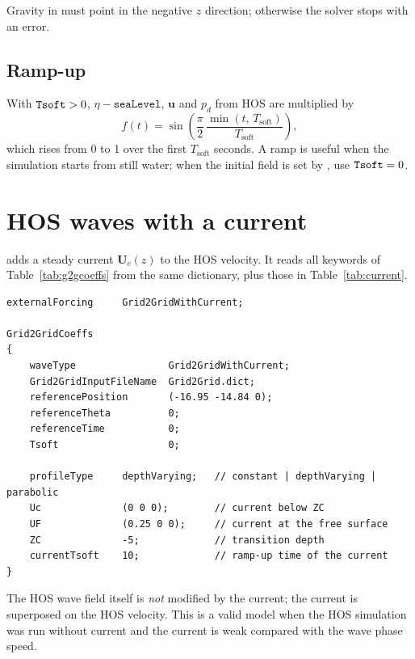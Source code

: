 Gravity in  must point in the negative $z$ direction; otherwise the solver
stops with an error.

\subsection{Ramp-up}
With $\texttt{Tsoft}>0$, $\eta - \texttt{seaLevel}$, $\mathbf u$ and $p_d$ from HOS are multiplied by
\begin{equation}
  f(t) = \sin\!\left(\frac{\pi}{2}\,\frac{\min(t,\,T_\mathrm{soft})}{T_\mathrm{soft}}\right),
\end{equation}
which rises from 0 to 1 over the first $T_\mathrm{soft}$ seconds. A ramp is useful when the
simulation starts from still water; when the initial field is set by , use
$\texttt{Tsoft}=0$.

\section{HOS waves with a current}
\label{sec:hos-current}
 adds a steady current $\mathbf U_c(z)$ to the HOS velocity. It reads
all keywords of Table~\ref{tab:g2gcoeffs} from the same  dictionary, plus
those in Table~\ref{tab:current}.
\begin{lstlisting}[caption={HOS waves with a depth-varying current (\file{tutorials/HOS\_with\_Current}).}]
externalForcing     Grid2GridWithCurrent;

Grid2GridCoeffs
{
    waveType                Grid2GridWithCurrent;
    Grid2GridInputFileName  Grid2Grid.dict;
    referencePosition       (-16.95 -14.84 0);
    referenceTheta          0;
    referenceTime           0;
    Tsoft                   0;

    profileType     depthVarying;   // constant | depthVarying | parabolic
    Uc              (0 0 0);        // current below ZC
    UF              (0.25 0 0);     // current at the free surface
    ZC              -5;             // transition depth
    currentTsoft    10;             // ramp-up time of the current
}
\end{lstlisting}
The HOS wave field itself is \emph{not} modified by the current; the current is superposed on the
HOS velocity. This is a valid model when the HOS simulation was run without current and the
current is weak compared with the wave phase speed.

